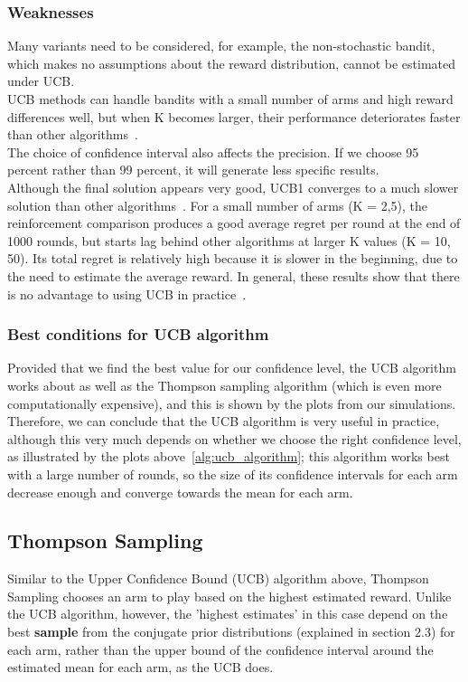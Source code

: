 \subsubsection{Weaknesses}
Many variants need to be considered, for example, the non-stochastic bandit, which makes no assumptions about the reward distribution, cannot be estimated under UCB\@.
\\UCB methods can handle bandits with a small number of arms and high reward differences well, but when K becomes larger, their performance deteriorates faster than other algorithms~\citep{kuleshov}.
\\The choice of confidence interval also affects the precision.
If we choose 95 percent rather than 99 percent, it will generate less specific results.
\\Although the final solution appears very good, UCB1 converges to a much slower solution than other algorithms~\citep{Auer2002}.
For a small number of arms (K = 2,5), the reinforcement comparison produces a good average regret per round at the end of 1000 rounds, but starts lag behind other algorithms at larger K values (K = 10, 50).
Its total regret is relatively high because it is slower in the beginning, due to the need to estimate the average reward.
In general, these results show that there is no advantage to using UCB in practice~\citep{kuleshov}.

\subsubsection{Best conditions for UCB algorithm}
Provided that we find the best value for our confidence level, the UCB algorithm works about as well as the Thompson sampling algorithm (which is even more computationally expensive), and this is shown by the plots from our simulations.
Therefore, we can conclude that the UCB algorithm is very useful in practice, although this very much depends on whether we choose the right confidence level, as illustrated by the plots above~\ref{alg:ucb_algorithm}; this algorithm works best with a large number of rounds, so the size of its confidence intervals for each arm decrease enough and converge towards the mean for each arm.

\subsection{Thompson Sampling}\label{subsec:thompson-sampling}
Similar to the Upper Confidence Bound (UCB) algorithm above, Thompson Sampling chooses an arm to play based on the highest estimated reward.
Unlike the UCB algorithm, however, the 'highest estimates' in this case depend on the best \textbf{sample} from the conjugate prior distributions (explained in section 2.3) for each arm, rather than the upper bound of the confidence interval around the estimated mean for each arm, as the UCB does.

